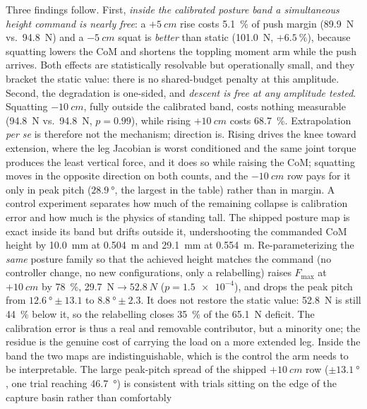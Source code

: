 \documentclass[conference]{IEEEtran}
\begin{document}
Three findings follow.
First, \emph{inside the calibrated posture band a simultaneous height command is
nearly free}: a ${+}\SI{5}{cm}$ rise costs \SI{5.1}{\percent} of push margin
(\SI{89.9}{N} vs.\ \SI{94.8}{N}) and a ${-}\SI{5}{cm}$ squat is
\emph{better} than static (\SI{101.0}{N}, $+\SI{6.5}{\percent}$), because
squatting lowers the CoM and shortens the toppling moment arm while the push
arrives. Both effects are statistically resolvable but operationally small,
and they bracket the static value: there is no shared-budget penalty at this
amplitude.
Second, the degradation is one-sided, and \emph{descent is free at any
amplitude tested}. Squatting ${-}\SI{10}{cm}$, fully outside the calibrated band, costs nothing measurable (\SI{94.8}{N} vs.\ \SI{94.8}{N}, $p{=}0.99$),
while rising ${+}\SI{10}{cm}$ costs \SI{68.7}{\percent}. Extrapolation
\emph{per se} is therefore not the mechanism; direction is. Rising drives the
knee toward extension, where the leg Jacobian is worst conditioned and the same
joint torque produces the least vertical force, and it does so while raising the
CoM; squatting moves in the opposite direction on both counts, and the
${-}\SI{10}{cm}$ row pays for it only in peak pitch ($\SI{28.9}{\degree}$, the
largest in the table) rather than in margin.
A control experiment separates how much of the remaining collapse is
calibration error and how much is the physics of standing tall. The shipped
posture map is exact inside its band but drifts outside it, undershooting the
commanded CoM height by \SI{10.0}{mm} at \SI{0.504}{m} and \SI{29.1}{mm} at
\SI{0.554}{m}. Re-parameterizing the \emph{same} posture family so that the
achieved height matches the command (no controller change, no new configurations, only a relabelling) raises $F_{\max}$ at ${+}\SI{10}{cm}$ by
\SI{78}{\percent}, \SI{29.7}{N}${\rightarrow}\SI{52.8}{N}$
($p{=}\num{1.5e-4}$), and drops the peak pitch from
$\SI{12.6}{\degree}{\pm}13.1$ to $\SI{8.8}{\degree}{\pm}2.3$. It does not
restore the static value: \SI{52.8}{N} is still \SI{44}{\percent} below it, so
the relabelling closes \SI{35}{\percent} of the \SI{65.1}{N} deficit. The
calibration error is thus a real and removable contributor, but a minority one;
the residue is the genuine cost of carrying the load on a more extended leg. Inside the band the two maps are
indistinguishable, which is the control the arm needs to be interpretable.
The large peak-pitch spread of the shipped ${+}\SI{10}{cm}$ row
($\pm\SI{13.1}{\degree}$, one trial reaching \SI{46.7}{\degree}) is consistent
with trials sitting on the edge of the capture basin rather than comfortably
\end{document}
